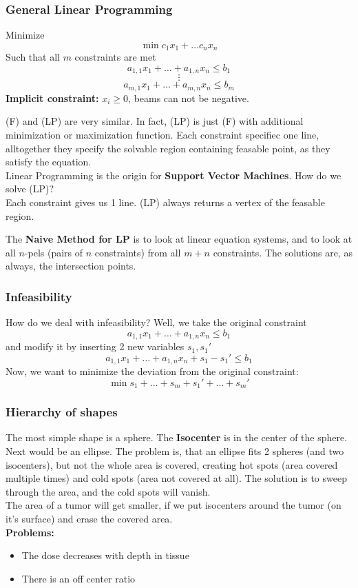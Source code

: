 \documentclass{exerciseBlue}
\begin{document}
\subsubsection{General Linear Programming}
Minimize
$$\min c_1x_1 + \dots c_nx_n$$
Such that all $m$ constraints are met
$$a_{1,1}x_1 + \dots + a_{1,n}x_n \leq b_1$$
$$\vdots$$
$$a_{m,1}x_1 + \dots + a_{m,n}x_n \leq b_m$$
\textbf{Implicit constraint:} $x_i \geq 0$, beams can not be negative.
\par
(F) and (LP) are very similar. In fact, (LP) is just (F) with additional minimization or maximization function. Each constraint specifiec one line, alltogether they specify the solvable region containing feasable point, as they satisfy the equation.\\
Linear Programming is the origin for \textbf{Support Vector Machines}. How do we solve (LP)?\\
Each constraint gives us 1 line. (LP) always returns a vertex of the feasable region.
\par The \textbf{Naive Method for LP} is to look at linear equation systems, and to look at all $n$-pels (pairs of $n$ constraints) from all $m+n$ constraints. The solutions are, as always, the intersection points.
\subsubsection{Infeasibility}
How do we deal with infeasibility? Well, we take the original constraint
$$a_{1,1}x_1 + \dots + a_{1,n}x_n \leq b_1$$
and modify it by inserting 2 new variables $s_1,s_1'$
$$a_{1,1}x_1 + \dots + a_{1,n}x_n+s_1-s_1' \leq b_1$$
Now, we want to minimize the deviation from the original constraint:\\
$$\min s_1+\dots + s_m + s_1' + \dots + s_m'$$
\subsubsection{Hierarchy of shapes}
The most simple shape is a sphere. The \textbf{Isocenter} is in the center of the sphere.\\
Next would be an ellipse. The problem is, that an ellipse fits 2 spheres (and two isocenters), but not the whole area is covered, creating hot spots (area covered multiple times) and cold spots (area not covered at all). The solution is to sweep through the area, and the cold spots will vanish.\\
The area of a tumor will get smaller, if we put isocenters around the tumor (on it's surface) and erase the covered area.\\
\textbf{Problems:} \begin{itemize}
	\item The dose decreases with depth in tissue
	\item There is an off center ratio
\end{itemize} 
\end{document}
